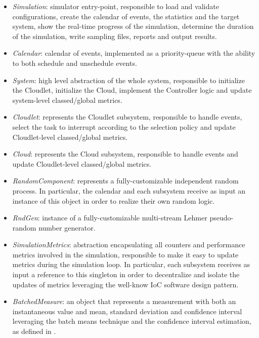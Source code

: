 \begin{itemize}

	\item \textit{Simulation}: simulator entry-point, responsible to load and validate configurations, create the calendar of events, the statistics and the target system, show the real-time progress of the simulation, determine the duration of the simulation, write sampling files, reports and output results.
	
	\item \textit{Calendar}: calendar of events, implemented as a priority-queue with the ability to both schedule and unschedule events.
	
	\item \textit{System}: high level abstraction of the whole system, responsible to initialize the Cloudlet, initialize the Cloud, implement the Controller logic and update system-level classed/global metrics.
	
	\item \textit{Cloudlet}: represents the Cloudlet subsystem, responsible to handle events, select the task to interrupt according to the selection policy and update Cloudlet-level classed/global metrics.
	
	\item \textit{Cloud}: represents the Cloud subsystem, responsible to handle events and update Cloudlet-level classed/global metrics.
	
	\item \textit{RandomComponent}: represents a fully-customizable independent random process. In particular, the calendar and each subsystem receive as input an instance of this object in order to realize their own random logic.
	
	\item \textit{RndGen}: instance of a fully-customizable multi-stream Lehmer pseudo-random number generator.
	
	\item \textit{SimulationMetrics}: abstraction encapsulating all counters and performance metrics involved in the simulation, responsible to make it easy to update metrics during the simulation loop. In particular, each subsystem receives as input a reference to this singleton in order to decentralize and isolate the updates of metrics leveraging the well-know IoC software design pattern.
	
	\item \textit{BatchedMeasure}: an object that represents a measurement with both an instantaneous value and mean, standard deviation and confidence interval leveraging the batch means technique and the confidence interval estimation, as defined in \cite{leemis2006discrete}.
	

\end{itemize}
